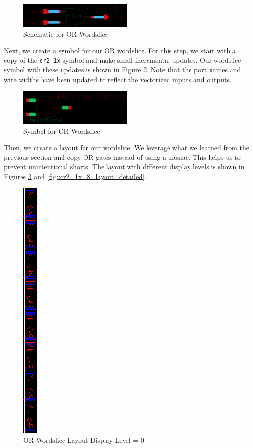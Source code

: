 \documentclass{article}
\begin{document}
	\begin{figure}[H]
		\centerline{\includegraphics[width=0.5\textwidth]{or2_1x_8_schematic.png}}
		\caption{Schematic for OR Wordslice}
		\label{fig::or2_1x_8_schematic}
	\end{figure}
	
	\noindent Next, we create a symbol for our OR wordslice. For this step, we start with a copy of the \texttt{or2\_1x} symbol and make small incremental updates. Our wordslice symbol with these updates is shown in Figure \ref{fig::or2_1x_8_symbol}. Note that the port names and wire widths have been updated to reflect the vectorized inputs and outputs.
	
	\begin{figure}[H]
		\centerline{\includegraphics[width=0.5\textwidth]{or2_1x_8_symbol.png}}
		\caption{Symbol for OR Wordslice}
		\label{fig::or2_1x_8_symbol}
	\end{figure}
	
	\noindent Then, we create a layout for our wordslice. We leverage what we learned from the previous section and copy OR gates instead of using a mosiac. This helps us to prevent unintentional shorts. The layout with different display levels is shown in Figures \ref{fig::or2_1x_8_layout_overview} and \ref{fig::or2_1x_8_layout_detailed}.
	
	\begin{figure}[H]
		\centerline{\includegraphics[height=0.8\textwidth, angle=270]{or2_1x_8_layout_overview.png}}
		\caption{OR Wordslice Layout Display Level = 0}
		\label{fig::or2_1x_8_layout_overview}
	\end{figure}
	
\end{document}
